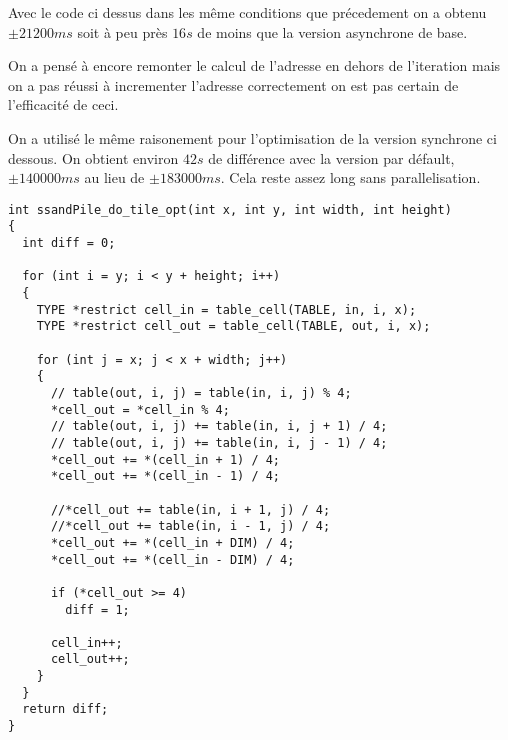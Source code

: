 \documentclass{article}
\begin{document}
Avec le code ci dessus dans les même conditions que précedement on a obtenu $\pm 21200 ms$ soit à peu près $16s$ de moins que la version asynchrone de base.
\par On a pensé à encore remonter le calcul de l'adresse en dehors de l'iteration mais on a pas réussi à incrementer l'adresse correctement on est pas certain de l'efficacité de ceci.
\ \\
\par On a utilisé le même raisonement pour l'optimisation de la version synchrone ci dessous. On obtient environ $42s$ de différence avec la version par défault, $\pm 140000 ms$ au lieu de $\pm 183000 ms$. Cela reste assez long sans parallelisation.

\begin{verbatim}
int ssandPile_do_tile_opt(int x, int y, int width, int height)
{
  int diff = 0;

  for (int i = y; i < y + height; i++)
  {
    TYPE *restrict cell_in = table_cell(TABLE, in, i, x);
    TYPE *restrict cell_out = table_cell(TABLE, out, i, x);

    for (int j = x; j < x + width; j++)
    {
      // table(out, i, j) = table(in, i, j) % 4;
      *cell_out = *cell_in % 4;
      // table(out, i, j) += table(in, i, j + 1) / 4;
      // table(out, i, j) += table(in, i, j - 1) / 4;
      *cell_out += *(cell_in + 1) / 4;
      *cell_out += *(cell_in - 1) / 4;

      //*cell_out += table(in, i + 1, j) / 4;
      //*cell_out += table(in, i - 1, j) / 4;
      *cell_out += *(cell_in + DIM) / 4;
      *cell_out += *(cell_in - DIM) / 4;

      if (*cell_out >= 4)
        diff = 1;

      cell_in++;
      cell_out++;
    }
  }
  return diff;
}
\end{verbatim}
\end{document}
